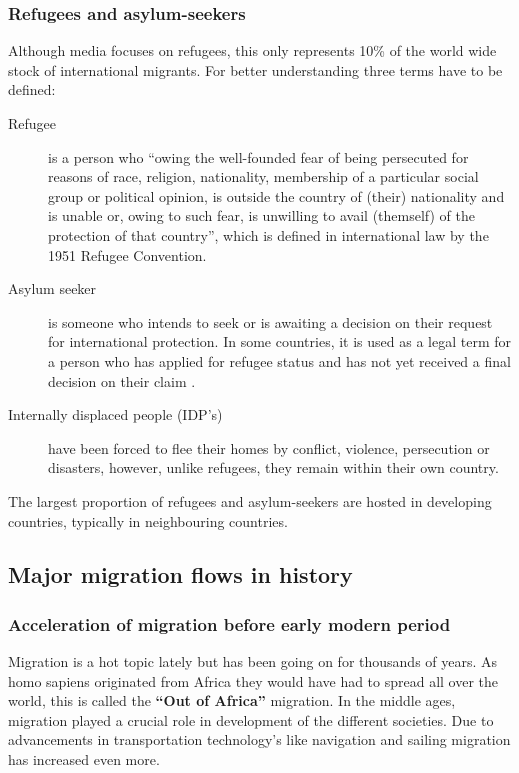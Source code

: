 \documentclass[../summary.tex]{subfiles}
\begin{document}
	\subsubsection{Refugees and asylum-seekers}
	Although media focuses on refugees, this only represents 10\% of the world wide stock of international migrants. For better understanding three terms have to be defined:
	\begin{description}
		\item[Refugee] is a person who ``owing the well-founded fear of being persecuted for reasons of race, religion, nationality, membership of a particular social group or political opinion, is outside the country of (their) nationality and is unable or, owing to such fear, is unwilling to avail (themself) of the protection of that country'', which is defined in international law by the 1951 Refugee Convention.
		\item[Asylum seeker] is someone who intends to seek or is awaiting a decision on their request for international protection. In some countries, it is used as a legal term for a person who has applied for refugee status and has not yet received a final decision on their claim .
		\item[Internally displaced people (IDP's)] have been forced to flee their homes by conflict, violence, persecution or disasters, however, unlike refugees, they remain within their own country.
	\end{description}
	The largest proportion of refugees and asylum-seekers are hosted in developing countries, typically in neighbouring countries.
	
	
	\subsection{Major migration flows in history}
	\subsubsection{Acceleration of migration before early modern period}
	Migration is a hot topic lately but has been going on for thousands of years. As homo sapiens originated from Africa they would have had to spread all over the world, this is called the \textbf{``Out of Africa''} migration.  In the middle ages, migration played a crucial role in development of the different societies. Due to advancements in transportation technology's like navigation and sailing migration has increased even more. 
	
\end{document}
